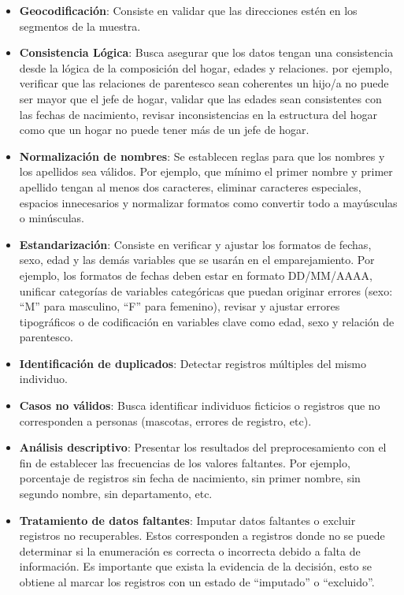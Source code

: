 \documentclass[
  12pt,
]{book}
\providecommand{\tightlist}{%
  \setlength{\itemsep}{0pt}\setlength{\parskip}{0pt}}
\begin{document}
\begin{itemize}
\tightlist
\item
  \textbf{Geocodificación}: Consiste en validar que las direcciones estén en los segmentos de la muestra.
\item
  \textbf{Consistencia Lógica}: Busca asegurar que los datos tengan una consistencia desde la lógica de la composición del hogar, edades y relaciones. por ejemplo, verificar que las relaciones de parentesco sean coherentes un hijo/a no puede ser mayor que el jefe de hogar, validar que las edades sean consistentes con las fechas de nacimiento, revisar inconsistencias en la estructura del hogar como que un hogar no puede tener más de un jefe de hogar.
\item
  \textbf{Normalización de nombres}: Se establecen reglas para que los nombres y los apellidos sea válidos. Por ejemplo, que mínimo el primer nombre y primer apellido tengan al menos dos caracteres, eliminar caracteres especiales, espacios innecesarios y normalizar formatos como convertir todo a mayúsculas o minúsculas.
\item
  \textbf{Estandarización}: Consiste en verificar y ajustar los formatos de fechas, sexo, edad y las demás variables que se usarán en el emparejamiento. Por ejemplo, los formatos de fechas deben estar en formato DD/MM/AAAA, unificar categorías de variables categóricas que puedan originar errores (sexo: ``M'' para masculino, ``F'' para femenino), revisar y ajustar errores tipográficos o de codificación en variables clave como edad, sexo y relación de parentesco.
\item
  \textbf{Identificación de duplicados}: Detectar registros múltiples del mismo individuo.
\item
  \textbf{Casos no válidos}: Busca identificar individuos ficticios o registros que no corresponden a personas (mascotas, errores de registro, etc).
\item
  \textbf{Análisis descriptivo}: Presentar los resultados del preprocesamiento con el fin de establecer las frecuencias de los valores faltantes. Por ejemplo, porcentaje de registros sin fecha de nacimiento, sin primer nombre, sin segundo nombre, sin departamento, etc.
\item
  \textbf{Tratamiento de datos faltantes}: Imputar datos faltantes o excluir registros no recuperables. Estos corresponden a registros donde no se puede determinar si la enumeración es correcta o incorrecta debido a falta de información. Es importante que exista la evidencia de la decisión, esto se obtiene al marcar los registros con un estado de ``imputado'' o ``excluido''.
\end{itemize}
\end{document}
